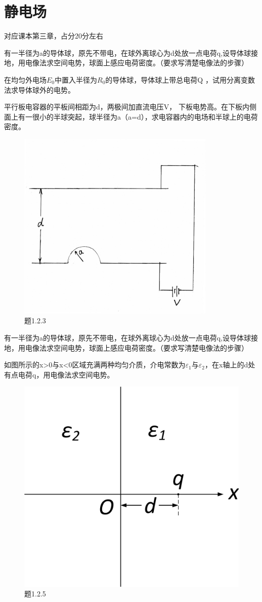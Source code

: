 \section{静电场}
对应课本第三章，占分20分左右

\begin{question}
有一半径为a的导体球，原先不带电，在球外离球心为d处放一点电荷q,设导体球接地，用电像法求空间电势，球面上感应电荷密度。（要求写清楚电像法的步骤）
\end{question}

\begin{question}
在均匀外电场$E_0$中置入半径为$R_0$的导体球，导体球上带总电荷Q ，试用分离变数法求导体球外的电势。
\end{question}

\begin{question}
平行板电容器的平板间相距为d，两极间加直流电压V，
下板电势高。在下板内侧面上有一很小的半球突起，球半径为a（a=d），求电容器内的电场和半球上的电荷密度。
\begin{figure}[ht]
\centering
\includegraphics[height=3 cm]{images/q1_2_3.jpg}
\caption{题1.2.3}
\end{figure}

\end{question}

\begin{question}
有一半径为a的导体球，原先不带电，在球外离球心为d处放一点电荷q,设导体球接地，用电像法求空间电势，球面上感应电荷密度。（要求写清楚电像法的步骤）
\end{question}

\begin{question}
如图所示的x>0与x<0区域充满两种均匀介质，介电常数为$\varepsilon_1$与$\varepsilon_2$，在x轴上的d处有点电荷q，用电像法求空间电势。
\begin{figure}[ht]
\centering
\includegraphics[height=3 cm]{images/q1_2_5.jpg}
\caption{题1.2.5}
\end{figure}
\end{question}

